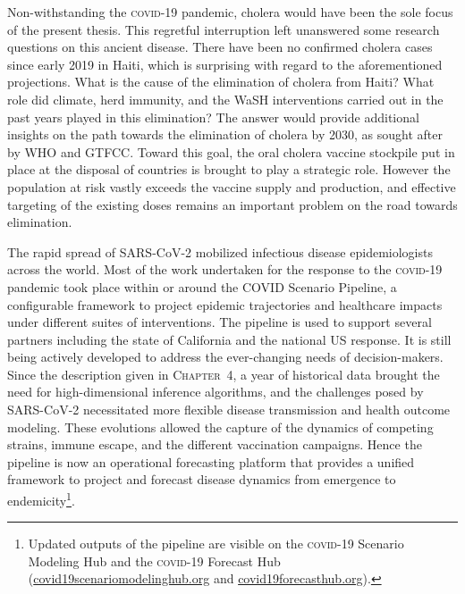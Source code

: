 Non-withstanding the \textsc{covid}-19 pandemic, cholera would have been the sole focus of the present thesis. This regretful interruption left unanswered some research questions on this ancient disease. There have been no confirmed cholera cases since early 2019 in Haiti, which is surprising with regard to the aforementioned projections. What is the cause of the elimination of cholera from Haiti? What role did climate, herd immunity, and the WaSH interventions carried out in the past years played\cite{Rebaudet:CaseareaTargetedRapid:2019} in this elimination? The answer would provide additional insights on the path towards the elimination of cholera by 2030, as sought after by WHO and GTFCC. Toward this goal, the oral cholera vaccine stockpile put in place at the disposal of countries is brought to play a strategic role\cite{GlobalTaskForceonCholeraControl:EndingCholeraGlobal:2017}. However the population at risk vastly exceeds the vaccine supply and production\cite{Pezzoli:GlobalOralCholera:2019}, and effective targeting of the existing doses remains an important problem\cite{Lessler:MappingBurdenCholera:2018} on the road towards elimination.

The rapid spread of SARS-CoV-2 mobilized infectious disease epidemiologists across the world. Most of the work undertaken for the response to the \textsc{covid}-19 pandemic took place within or around the COVID Scenario Pipeline, a configurable framework to project epidemic trajectories and healthcare impacts under different suites of interventions. The pipeline is used to support several partners including the state of California and the national US response. It is still being actively developed to address the ever-changing needs of decision-makers. Since the description given in \textsc{Chapter~4}, a year of historical data brought the need for high-dimensional inference algorithms, and the challenges posed by SARS-CoV-2 necessitated more flexible disease transmission and health outcome modeling. These evolutions allowed the capture of the dynamics of competing strains, immune escape, and the different vaccination campaigns\cite{Borchering:ModelingFutureCOVID19:2021}. Hence the pipeline is now an operational forecasting platform that provides a unified framework to project and forecast disease dynamics from emergence to endemicity\footnote{Updated outputs of the pipeline are visible on the \textsc{covid}-19 Scenario Modeling Hub and the \textsc{covid}-19 Forecast Hub (\url{covid19scenariomodelinghub.org} and \url{covid19forecasthub.org}).}.

